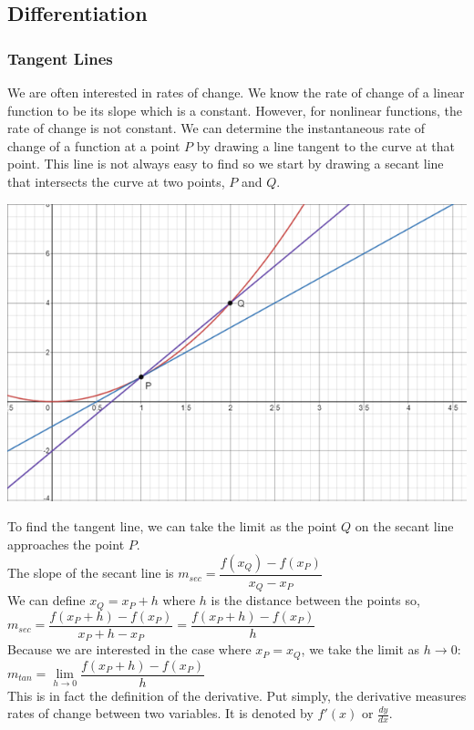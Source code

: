 \subsection{Differentiation}

\subsubsection{Tangent Lines}
We are often interested in rates of change. We know the rate of change of a linear function to be its slope which is a constant. However, for nonlinear functions, the rate of change is not constant. We can determine the instantaneous rate of change of a function at a point $P$ by drawing a line tangent to the curve at that point. This line is not always easy to find so we start by drawing a secant line that intersects the curve at two points, $P$ and $Q$.\\
\centerline{\includegraphics[scale =0.7]{Images/DifferentialCalculusPictures/Tangent.png}}
To find the tangent line, we can take the limit as the point $Q$ on the secant line approaches the point $P$.\\
The slope of the secant line is $m_{sec}=\dfrac{f(x_Q)-f(x_P)}{x_Q-x_P}$\\
We can define $x_Q=x_P+h$ where $h$ is the distance between the points so,\\ ${m_{sec}=\dfrac{f(x_P+h)-f(x_P)}{x_P+h-x_P}=\dfrac{f(x_P+h)-f(x_P)}{h}}$\\
Because we are interested in the case where $x_P=x_Q$, we take the limit as $h\to 0$:\\
$m_{tan}=\displaystyle{\lim \limits_{h\to 0}\dfrac{f(x_P+h)-f(x_P)}{h}}$\\
This is in fact the definition of the derivative. Put simply, the derivative measures rates of change between two variables. It is denoted by $f'(x)$ or $\frac{dy}{dx}$.\\
